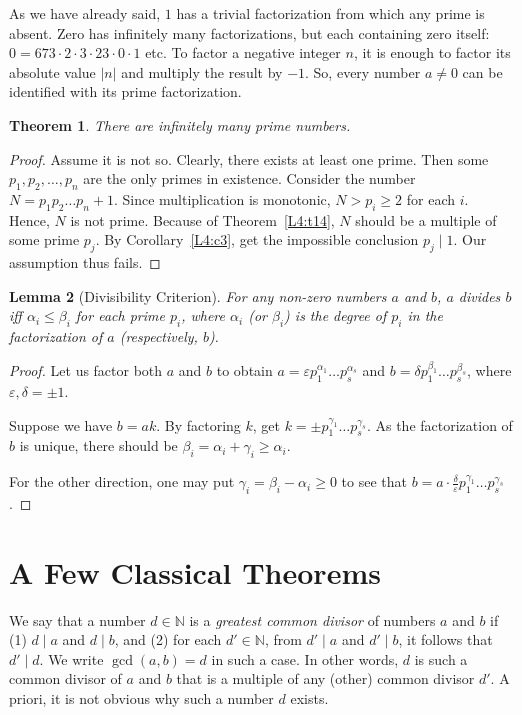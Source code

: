 \documentclass[12pt,notitlepage]{article}
\theoremstyle{plain}
\newtheorem{thm}{Theorem}[section]
\newtheorem{lemma}[thm]{Lemma}
\theoremstyle{definition}
\theoremstyle{plain}
\newcommand{\N}{\mathbb{N}}
\newcommand{\eps}{\varepsilon}
\newcommand{\1}{\mathbf{1}}
\newcommand{\0}{\mathbf{0}}
\newcommand{\dvd}{\mathop{\mid}}
\begin{document}
As we have already said, $1$ has a trivial factorization from which any prime is absent. Zero has infinitely many factorizations, but each containing zero itself: $0 = 673 \cdot 2 \cdot 3 \cdot 23 \cdot 0 \cdot 1$ etc. To factor a negative integer $n$, it is enough to factor its absolute value $|n|$ and multiply the result by $-1$. So, every number $a \neq 0$ can be identified with its prime factorization.

\begin{thm}
There are infinitely many prime numbers.
\end{thm}
\begin{proof}
Assume it is not so. Clearly, there exists at least one prime. Then some $p_1, p_2, \ldots, p_n$ are the only primes in existence. Consider the number $N = p_1 p_2 \ldots p_n + 1$. Since multiplication is monotonic, $N > p_i \geq 2$ for each $i$. Hence, $N$ is not prime. Because of Theorem~\ref{L4:t14}, $N$ should be a multiple of some prime $p_j$. By Corollary~\ref{L4:c3}, get the impossible conclusion $p_j \dvd 1$. Our assumption thus fails.
\end{proof}



\begin{lemma}[Divisibility Criterion]\label{L4:l16}
For any non-zero numbers $a$ and $b$, $a$ divides $b$ iff $\alpha_i \leq \beta_i$ for each prime $p_i$, where $\alpha_i$ (or $\beta_i$) is the degree of $p_i$ in the factorization of $a$ (respectively, $b$).
\end{lemma} 
\begin{proof}
Let us factor both $a$ and $b$ to obtain $a = \eps p^{\alpha_1}_1\ldots p^{\alpha_s}_s$ and $b = \delta p^{\beta_1}_1\ldots p^{\beta_s}_s$, where $\eps, \delta = \pm 1$.

Suppose we have $b = a k$. By factoring $k$, get $k = \pm p^{\gamma_1}_1\ldots p^{\gamma_s}_s$. As the factorization of $b$ is unique, there should be $\beta_i = \alpha_i + \gamma_i \geq \alpha_i$.

For the other direction, one may put $\gamma_i = \beta_i - \alpha_i \geq 0$ to see that $b = a \cdot \frac{\delta}{\eps}  p^{\gamma_1}_1\ldots p^{\gamma_s}_s$.
\end{proof}

\newpage
\section{A Few Classical Theorems}

We say that a number $d \in \N$ is a \emph{greatest common divisor} of numbers $a$ and $b$ if (1) $d \dvd a$ and $d \dvd b$, and (2) for each $d' \in \N$, from $d' \dvd a$ and $d' \dvd b$, it follows that $d' \dvd d$. We write $\gcd(a, b) = d$ in such a case. In other words, $d$ is such a common divisor of $a$ and $b$ that is a multiple of any (other) common divisor $d'$. A priori, it is not obvious why such a number $d$ exists.
\end{document}
